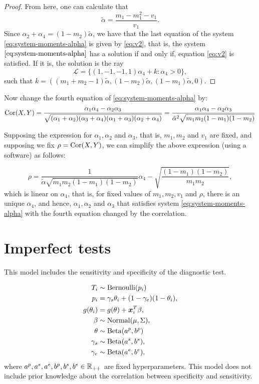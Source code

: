\begin{proof}
From here, one can calculate that
$$
\tilde{\alpha} = \frac{m_1 - m_1^2 - v_1}{v_1}.
$$
Since $\alpha_2 + \alpha_4 = (1 - m_2)\tilde{\alpha}$, we have that the last
equation of the system \eqref{eq:system-moments-alpha} is given by
\eqref{eq:v2}, that is, the system $\eqref{eq:system-moments-alpha}$ has a solution if and
only if, equation \eqref{eq:v2} is satisfied. If it is, the solution is the ray 
$$
\mathcal{L} = \{(1,-1,-1,1)\alpha_4 + k : \alpha_4 > 0\}, 
$$
such that $k = \left((m_1 + m_2 - 1)\tilde{\alpha}, (1-m_2)\tilde{\alpha},
(1-m_1)\tilde{\alpha}, 0\right)$. 

\end{proof}


Now change the fourth equation of \eqref{eq:system-moments-alpha} by: 
$$
\operatorname{Cor}(X,Y) = \frac{\alpha_1\alpha_4 - \alpha_2\alpha_3}{\sqrt{(\alpha_1+\alpha_2)(\alpha_3+\alpha_4)(\alpha_1+\alpha_3)(\alpha_2+\alpha_4)}} = \frac{\alpha_1\alpha_4 - \alpha_2\alpha_3}{\tilde{\alpha}^2\sqrt{m_1m_2(1-m_1)(1-m_2)}}
$$

Supposing the expression for $\alpha_1, \alpha_2$ and $\alpha_3$, that is,
$m_1, m_2$ and $v_1$ are fixed, and supposing we fix $\rho = \operatorname{Cor}(X,Y)$, we
can simplify the above expression (using a software) as follows: 

$$
\rho = \frac{1}{\tilde{\alpha}\sqrt{m_1m_2(1-m_1)(1-m_2)}}\alpha_4 - \sqrt{\frac{(1 - m_1)(1 - m_2)}{m_1m_2}},
$$
which is linear on $\alpha_4$, that is, for fixed values of
$m_1, m_2, v_1$ and $\rho$, there is an unique $\alpha_4$, and hence,
$\alpha_1, \alpha_2$ and $\alpha_3$ that satisfies system
\eqref{eq:system-moments-alpha} with the fourth equation changed by the
correlation. 

\section{Imperfect tests}

This model includes the sensitivity and specificity of the diagnostic test. 

\begin{equation}
  \begin{aligned}
    T_i &\sim \operatorname{Bernoulli}(p_i) \\
    p_i &= \gamma_s\theta_i + (1-\gamma_e)(1 - \theta_i),  \\
    g(\theta_i) &= g(\theta) + \boldsymbol{x}_i^T\beta,  \\
    \beta &\sim \operatorname{Normal}(\mu, \Sigma), \\ 
    \theta &\sim \operatorname{Beta}(a^p, b^p) \\
    \gamma_s &\sim \operatorname{Beta}(a^s, b^s), \\
    \gamma_e &\sim \operatorname{Beta}(a^e, b^e), \\    
  \end{aligned}  
\end{equation}
where $a^p, a^s, a^e, b^p, b^s, b^e \in \mathbb{R}_{++}$ are fixed hyperparameters.
This model does not include prior knowledge about the correlation between
specificity and sensitivity. 

